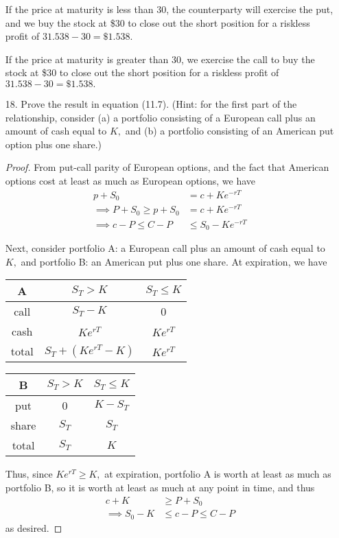 \documentclass{article}
\begin{document}
\begin{itemize}
\begin{soln}
			If the price at maturity is less than 30, the counterparty will exercise the put, and we buy the stock at \$30 to close out the short position for a riskless profit of $31.538-30=\$1.538.$

			If the price at maturity is greater than 30, we exercise the call to buy the stock at \$30 to close out the short position for a riskless profit of $31.538-30=\$1.538.$
		\end{soln}

	\item[18.] Prove the result in equation (11.7). (Hint: for the first part of the relationship, consider (a) a portfolio consisting of a European call plus an amount of cash equal to $K,$ and (b) a portfolio consisting of an American put option plus one share.)
		\begin{proof}
			From put-call parity of European options, and the fact that American options cost at least as much as European options, we have
			\begin{align*}
				p+S_0 &= c+Ke^{-rT} \\
				\implies P + S_0 \ge p+S_0 &= c+Ke^{-rT} \\
				\implies c - P \le C - P &\le S_0 - Ke^{-rT}
			\end{align*}
			
			Next, consider portfolio A: a European call plus an amount of cash equal to $K,$ and portfolio B: an American put plus one share. At expiration, we have
			\begin{center}
				\begin{tabular}{c|cc}
					A & $S_T>K$ & $S_T\le K$ \\
					\hline
					call & $S_T-K$ & 0 \\
					cash & $Ke^{rT}$ & $Ke^{rT}$ \\
					\hline
					total & $S_T+(Ke^{rT}-K)$ & $Ke^{rT}$
				\end{tabular}
			\end{center}
			\begin{center}
				\begin{tabular}{c|cc}
					B & $S_T>K$ & $S_T\le K$ \\
					\hline
					put & 0 & $K-S_T$ \\
					share & $S_T$ & $S_T$ \\
					\hline
					total & $S_T$ & $K$
				\end{tabular}
			\end{center}
			Thus, since $Ke^{rT}\ge K,$ at expiration, portfolio A is worth at least as much as portfolio B, so it is worth at least as much at any point in time, and thus
			\begin{align*}
				c + K &\ge P + S_0 \\
				\implies S_0 - K &\le c - P \le C - P
			\end{align*}
			as desired.
		\end{proof}


\end{itemize}
\end{document}
